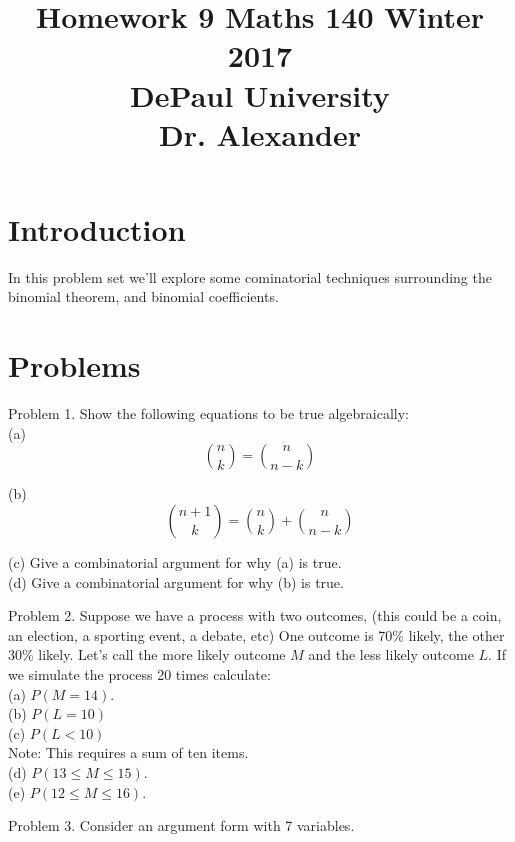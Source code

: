 \documentclass[16 pt]{amsart}
\theoremstyle{definition}
\theoremstyle{remark}
\numberwithin{equation}{subsection}
\begin{document}
\title{Homework 9 Maths 140 Winter 2017 \\ DePaul University\\Dr. Alexander}
\maketitle

\section{Introduction}
In this problem set we'll explore some cominatorial techniques surrounding the binomial theorem, and binomial coefficients.


\section{Problems}

Problem 1.  Show the following equations to be true algebraically:\\

(a)
\[
\binom{n}{k} = \binom{n}{n-k}
\]

(b) 
\[
\binom{n+1}{k} = \binom{n}{k} + \binom{n}{n-k}
\]

(c) Give a combinatorial argument for why (a) is true.\\

(d) Give a combinatorial argument for why (b) is true.

\newpage

Problem 2. Suppose we have a process with two outcomes, (this could be a coin, an election, a sporting event, a debate, etc) One outcome is 70\% likely, the other 30\% likely.  Let's call the more likely outcome $M$ and the less likely outcome $L$.  If we simulate the process 20 times calculate:\\

(a) $P(M=14)$.\\

(b) $P(L=10)$\\

(c) $P(L<10)$\\
Note: This requires a sum of ten items.\\

(d) $P(13\le M \le 15)$.\\

(e) $P(12\le M \le 16)$.



\newpage

Problem 3. Consider an argument form with 7 variables.\\
\end{document}
